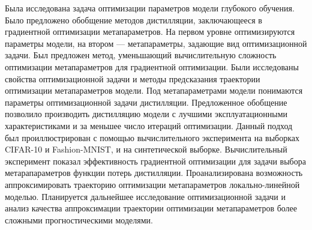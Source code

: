\documentclass[12pt]{a&t}
\begin{document}
Была исследована задача оптимизации параметров модели глубокого обучения. Было предложено обобщение методов дистилляции, заключающееся в градиентной оптимизации метапараметров. На первом уровне оптимизируются параметры модели, на втором --- метапараметры, задающие вид оптимизационной задачи. Был предложен метод, уменьшающий вычислительную сложность оптимизации метапараметров для градиентной оптимизации.   Были исследованы свойства оптимизационной задачи и методы предсказания траектории оптимизации метапараметров модели. Под метапараметрами модели понимаются параметры оптимизационной задачи дистилляции. Предложенное обобщение позволило производить дистилляцию модели с лучшими эксплуатационными характеристиками и за меньшее число итераций оптимизации.  Данный подход был проиллюстрирован с помощью вычислительного эксперимента на выборках CIFAR-10 и Fashion-MNIST, и на синтетической выборке. Вычислительный эксперимент показал эффективность градиентной оптимизации для задачи выбора метарапараметров функции потерь дистилляции. Проанализирована возможность аппроксимировать траекторию оптимизации метапараметров локально-линейной моделью. Планируется дальнейшее исследование оптимизационной задачи и анализ качества аппроксимации траектории оптимизации метапараметров более сложными прогностическими моделями.
\end{document}
